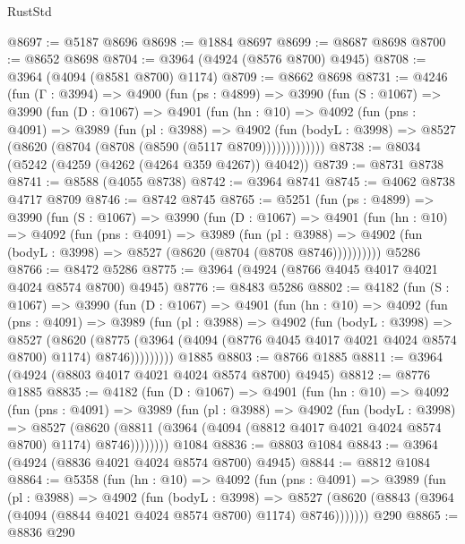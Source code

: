 \begin{lexlean}{RustStd}
\begin{coremodule}
@8697 := @5187 @8696
@8698 := @1884 @8697
@8699 := @8687 @8698
@8700 := @8652 @8698
@8704 := @3964 (@4924 (@8576 @8700) @4945)
@8708 := @3964 (@4094 (@8581 @8700) @1174)
@8709 := @8662 @8698
@8731 := @4246
    (fun (Γ : @3994) =>
    @4900
      (fun (ps : @4899) =>
      @3990
        (fun (S : @1067) =>
        @3990
          (fun (D : @1067) =>
          @4901
            (fun (hn : @10) =>
            @4092
              (fun (pns : @4091) =>
              @3989
                (fun (pl : @3988) =>
                @4902
                  (fun (bodyL : @3998) =>
                  @8527 (@8620 (@8704 (@8708 (@8590 (@5117 @8709)))))))))))))
@8738 := @8034 (@5242 (@4259 (@4262 (@4264 @359 @4267)) @4042))
@8739 := @8731 @8738
@8741 := @8588 (@4055 @8738)
@8742 := @3964 @8741
@8745 := @4062 @8738 @4717 @8709
@8746 := @8742 @8745
@8765 := @5251
    (fun (ps : @4899) =>
    @3990
      (fun (S : @1067) =>
      @3990
        (fun (D : @1067) =>
        @4901
          (fun (hn : @10) =>
          @4092
            (fun (pns : @4091) =>
            @3989
              (fun (pl : @3988) =>
              @4902 (fun (bodyL : @3998) => @8527 (@8620 (@8704 (@8708 @8746))))))))))
    @5286
@8766 := @8472 @5286
@8775 := @3964 (@4924 (@8766 @4045 @4017 @4021 @4024 @8574 @8700) @4945)
@8776 := @8483 @5286
@8802 := @4182
    (fun (S : @1067) =>
    @3990
      (fun (D : @1067) =>
      @4901
        (fun (hn : @10) =>
        @4092
          (fun (pns : @4091) =>
          @3989
            (fun (pl : @3988) =>
            @4902
              (fun (bodyL : @3998) =>
              @8527
                (@8620
                  (@8775
                    (@3964 (@4094 (@8776 @4045 @4017 @4021 @4024 @8574 @8700) @1174) @8746)))))))))
    @1885
@8803 := @8766 @1885
@8811 := @3964 (@4924 (@8803 @4017 @4021 @4024 @8574 @8700) @4945)
@8812 := @8776 @1885
@8835 := @4182
    (fun (D : @1067) =>
    @4901
      (fun (hn : @10) =>
      @4092
        (fun (pns : @4091) =>
        @3989
          (fun (pl : @3988) =>
          @4902
            (fun (bodyL : @3998) =>
            @8527
              (@8620 (@8811 (@3964 (@4094 (@8812 @4017 @4021 @4024 @8574 @8700) @1174) @8746))))))))
    @1084
@8836 := @8803 @1084
@8843 := @3964 (@4924 (@8836 @4021 @4024 @8574 @8700) @4945)
@8844 := @8812 @1084
@8864 := @5358
    (fun (hn : @10) =>
    @4092
      (fun (pns : @4091) =>
      @3989
        (fun (pl : @3988) =>
        @4902
          (fun (bodyL : @3998) =>
          @8527 (@8620 (@8843 (@3964 (@4094 (@8844 @4021 @4024 @8574 @8700) @1174) @8746)))))))
    @290
@8865 := @8836 @290

\end{coremodule}
\end{lexlean}
